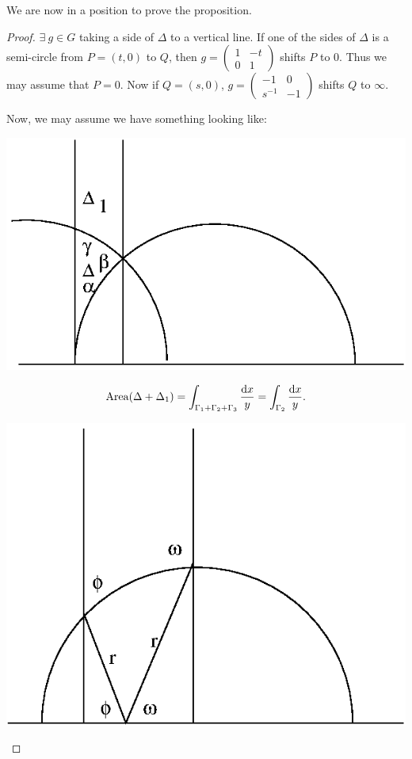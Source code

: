 \documentclass{notes}
\theoremstyle{plain}
\DeclareMathOperator{\Area}{Area}
\begin{document}
We are now in a position to prove the proposition.

\begin{proof}
$\exists\ g \in G$ taking a side of $\Delta$ to a vertical line.  If
one of the sides of $\Delta$ is a semi-circle from $P=(t,0)$ to $Q$, then
$g = \left(
\begin{matrix}
1 & -t \\ 0 & 1
\end{matrix}
\right)$ shifts $P$ to $0$.  Thus we may assume that $P = 0$.  Now if $Q =
(s,0)$, $g = \left(
\begin{matrix}
-1 & 0 \\ s^{-1} & -1
\end{matrix}
\right)$ shifts $Q$ to $\infty$.

Now, we may assume we have something looking like:

\begin{center}
\includegraphics{htri2.eps}
\end{center}

\[
\Area(\Delta + \Delta_1) = \int_{\Gamma_1 + \Gamma_2 + \Gamma_3}
\frac{\ud x}{y}
= \int_{\Gamma_2} \frac{\ud x}{y}.
\]

\begin{center}
\includegraphics{htri3.eps}
\end{center}


\end{proof}
\end{document}
